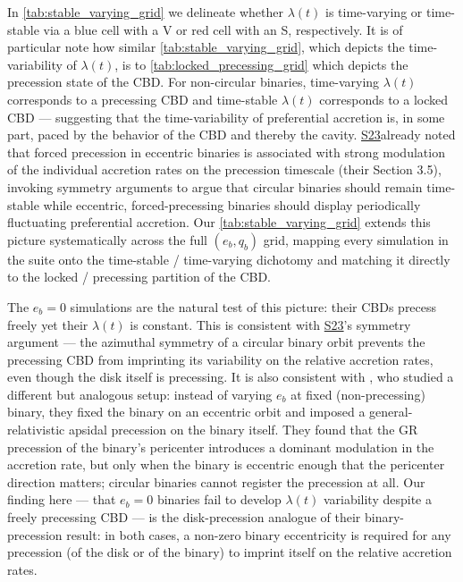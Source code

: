 \documentclass[fleqn,usenatbib]{mnras}
\newcommand{\Stwentythree}{\href{https://doi.org/10.1093/mnras/stac3263}{S23}}
\begin{document}
In \autoref{tab:stable_varying_grid} we delineate whether $\lambda(t)$ is time-varying or time-stable via a blue cell with a V or red cell with an S, respectively. It is of particular note how similar \autoref{tab:stable_varying_grid}, which depicts the time-variability of $\lambda(t)$, is to \autoref{tab:locked_precessing_grid} which depicts the precession state of the CBD. For non-circular binaries, time-varying $\lambda(t)$ corresponds to a precessing CBD and time-stable $\lambda(t)$ corresponds to a locked CBD --- suggesting that the time-variability of preferential accretion is, in some part, paced by the behavior of the CBD and thereby the cavity. \Stwentythree already noted that forced precession in eccentric binaries is associated with strong modulation of the individual accretion rates on the precession timescale (their Section 3.5), invoking symmetry arguments to argue that circular binaries should remain time-stable while eccentric, forced-precessing binaries should display periodically fluctuating preferential accretion. Our \autoref{tab:stable_varying_grid} extends this picture systematically across the full $(e_b, q_b)$ grid, mapping every simulation in the suite onto the time-stable / time-varying dichotomy and matching it directly to the locked / precessing partition of the CBD.

The $e_b = 0$ simulations are the natural test of this picture: their CBDs precess freely yet their $\lambda(t)$ is constant. This is consistent with \Stwentythree's symmetry argument --- the azimuthal symmetry of a circular binary orbit prevents the precessing CBD from imprinting its variability on the relative accretion rates, even though the disk itself is precessing. It is also consistent with \citealt{DeLaurentiis24}, who studied a different but analogous setup: instead of varying $e_b$ at fixed (non-precessing) binary, they fixed the binary on an eccentric orbit and imposed a general-relativistic apsidal precession on the binary itself. They found that the GR precession of the binary's pericenter introduces a dominant modulation in the accretion rate, but only when the binary is eccentric enough that the pericenter direction matters; circular binaries cannot register the precession at all. Our finding here --- that $e_b = 0$ binaries fail to develop $\lambda(t)$ variability despite a freely precessing CBD --- is the disk-precession analogue of their binary-precession result: in both cases, a non-zero binary eccentricity is required for any precession (of the disk or of the binary) to imprint itself on the relative accretion rates.
\end{document}
